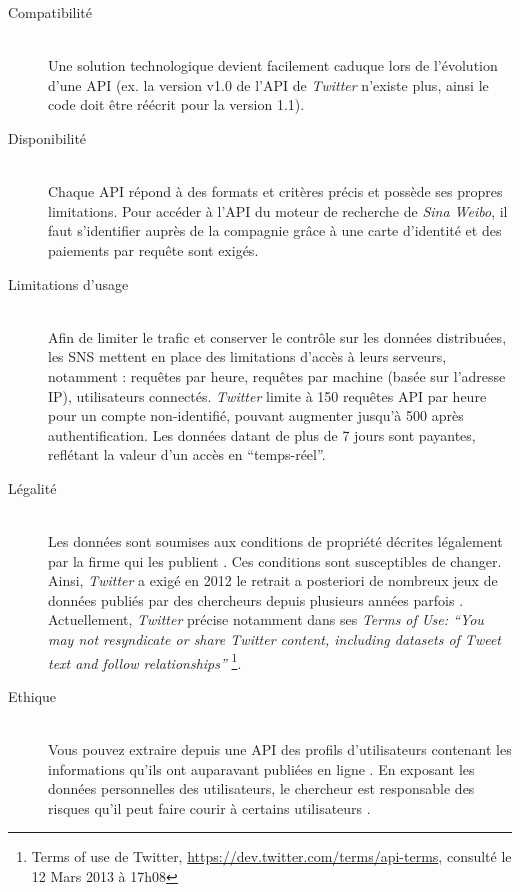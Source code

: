 \begin{description}
    
    \item[Compatibilité] 
    \hfill \\
    Une solution technologique devient facilement caduque lors de l{\textquoteright}évolution d{\textquoteright}une API (ex. la version  v1.0 de l'API de \textit{Twitter} n{\textquoteright}existe plus, ainsi le code doit \^etre réécrit pour la version 1.1).  
    
    \item [Disponibilité] 
    \hfill \\
    Chaque API répond à des formats et critères précis et possède ses propres limitations. Pour accéder à l{\textquoteright}API du moteur de recherche de \textit{Sina Weibo}, il faut s{\textquoteright}identifier auprès de la compagnie gr\^ace à une carte d{\textquoteright}identité et des paiements par requ\^ete sont exigés.

    \item[Limitations d{\textquoteright}usage] 
    \hfill \\
    Afin de limiter le trafic et conserver le contr\^ole sur les données distribuées, les SNS mettent en place des limitations d{\textquoteright}accès à leurs serveurs, notamment : requ\^etes par heure, requ\^etes par machine (basée sur l{\textquoteright}adresse IP), utilisateurs connectés. \textit{Twitter} limite à 150 requ\^etes API par heure pour un compte non-identifié, pouvant augmenter jusqu{\textquoteright}à 500 après authentification. Les données datant de plus de 7 jours sont payantes, reflétant la valeur d{\textquoteright}un accès en {\textquotedblleft}temps-réel{\textquotedblright}.
    
    \item[Légalité]
    \hfill \\
    Les données sont soumises aux conditions de propriété décrites légalement par la firme qui les publient \citep{Clifton2006}. Ces conditions sont susceptibles de changer. Ainsi, \textit{Twitter} a exigé en 2012 le retrait a posteriori de nombreux jeux de données publiés par des chercheurs depuis plusieurs années parfois \citep{McCreadie2012}. Actuellement, \textit{Twitter} précise notamment dans ses \textit{Terms of Use: {\textquotedblleft}You may not resyndicate or share Twitter content, including datasets of Tweet text and follow relationships{\textquotedblright} }\footnote{ Terms of use de Twitter, \url{https://dev.twitter.com/terms/api-terms}, consulté le 12 Mars 2013 à 17h08}.
    
    \item[Ethique]
    \hfill \\
    Vous pouvez extraire depuis une API des profils d{\textquoteright}utilisateurs contenant les informations qu{\textquoteright}ils ont auparavant publiées en ligne \citep{Felt2008}. En exposant les données personnelles des utilisateurs, le chercheur est responsable des risques qu{\textquoteright}il  peut faire courir à certains utilisateurs \citep{Rieder2005}.  
\end{description}

